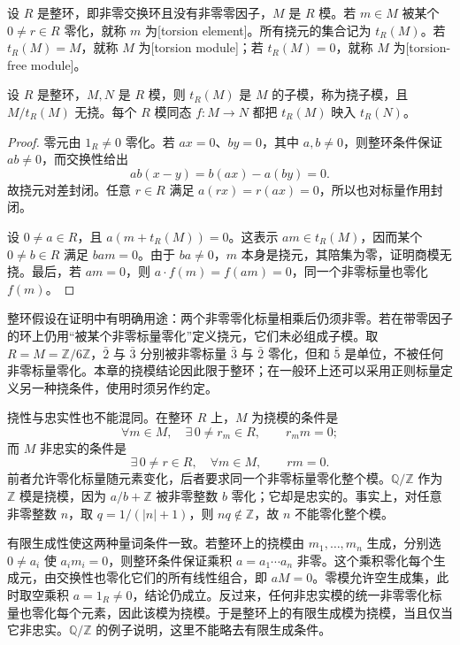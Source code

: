 \begin{definition}\label{b2:def:torsion-module}
	设 \(R\) 是整环，即非零交换环且没有非零零因子，\(M\) 是 \(R\) 模。若 \(m\in M\) 被某个 \(0\ne r\in R\) 零化，就称 \(m\) 为[torsion element]。所有挠元的集合记为 \(t_R(M)\)。若 \(t_R(M)=M\)，就称 \(M\) 为[torsion module]；若 \(t_R(M)=0\)，就称 \(M\) 为[torsion-free module]。
\end{definition}

\begin{proposition}\label{b2:prop:torsion-submodule}
	设 \(R\) 是整环，\(M,N\) 是 \(R\) 模，则 \(t_R(M)\) 是 \(M\) 的子模，称为挠子模，且 \(M/t_R(M)\) 无挠。每个 \(R\) 模同态 \(f:M\to N\) 都把 \(t_R(M)\) 映入 \(t_R(N)\)。
\end{proposition}
\begin{proof}
	零元由 \(1_R\ne0\) 零化。若 \(ax=0\)、\(by=0\)，其中 \(a,b\ne0\)，则整环条件保证 \(ab\ne0\)，而交换性给出
	\[
		ab(x-y)=b(ax)-a(by)=0.
	\]
	故挠元对差封闭。任意 \(r\in R\) 满足 \(a(rx)=r(ax)=0\)，所以也对标量作用封闭。

	设 \(0\ne a\in R\)，且 \(a(m+t_R(M))=0\)。这表示 \(am\in t_R(M)\)，因而某个 \(0\ne b\in R\) 满足 \(bam=0\)。由于 \(ba\ne0\)，\(m\) 本身是挠元，其陪集为零，证明商模无挠。最后，若 \(am=0\)，则 \(a\cdot f(m)=f(am)=0\)，同一个非零标量也零化 \(f(m)\)。
\end{proof}

整环假设在证明中有明确用途：两个非零零化标量相乘后仍须非零。若在带零因子的环上仍用“被某个非零标量零化”定义挠元，它们未必组成子模。取 \(R=M=\mathbb Z/6\mathbb Z\)，\(\bar2\) 与 \(\bar3\) 分别被非零标量 \(\bar3\) 与 \(\bar2\) 零化，但和 \(\bar5\) 是单位，不被任何非零标量零化。本章的挠模结论因此限于整环；在一般环上还可以采用正则标量定义另一种挠条件，使用时须另作约定。

\ProseParagraphBreak
挠性与忠实性也不能混同。在整环 \(R\) 上，\(M\) 为挠模的条件是
\[
	\forall m\in M,\quad \exists\,0\ne r_m\in R,\qquad r_m m=0;
\]
而 \(M\) 非忠实的条件是
\[
	\exists\,0\ne r\in R,\quad \forall m\in M,\qquad rm=0.
\]
前者允许零化标量随元素变化，后者要求同一个非零标量零化整个模。\(\mathbb Q/\mathbb Z\) 作为 \(\mathbb Z\) 模是挠模，因为 \(a/b+\mathbb Z\) 被非零整数 \(b\) 零化；它却是忠实的。事实上，对任意非零整数 \(n\)，取 \(q=1/(|n|+1)\)，则 \(nq\notin\mathbb Z\)，故 \(n\) 不能零化整个模。

\ProseParagraphBreak
有限生成性使这两种量词条件一致。若整环上的挠模由 \(m_1,\ldots,m_n\) 生成，分别选 \(0\ne a_i\) 使 \(a_im_i=0\)，则整环条件保证乘积 \(a=a_1\cdots a_n\) 非零。这个乘积零化每个生成元，由交换性也零化它们的所有线性组合，即 \(aM=0\)。零模允许空生成集，此时取空乘积 \(a=1_R\ne0\)，结论仍成立。反过来，任何非忠实模的统一非零零化标量也零化每个元素，因此该模为挠模。于是整环上的有限生成模为挠模，当且仅当它非忠实。\(\mathbb Q/\mathbb Z\) 的例子说明，这里不能略去有限生成条件。

